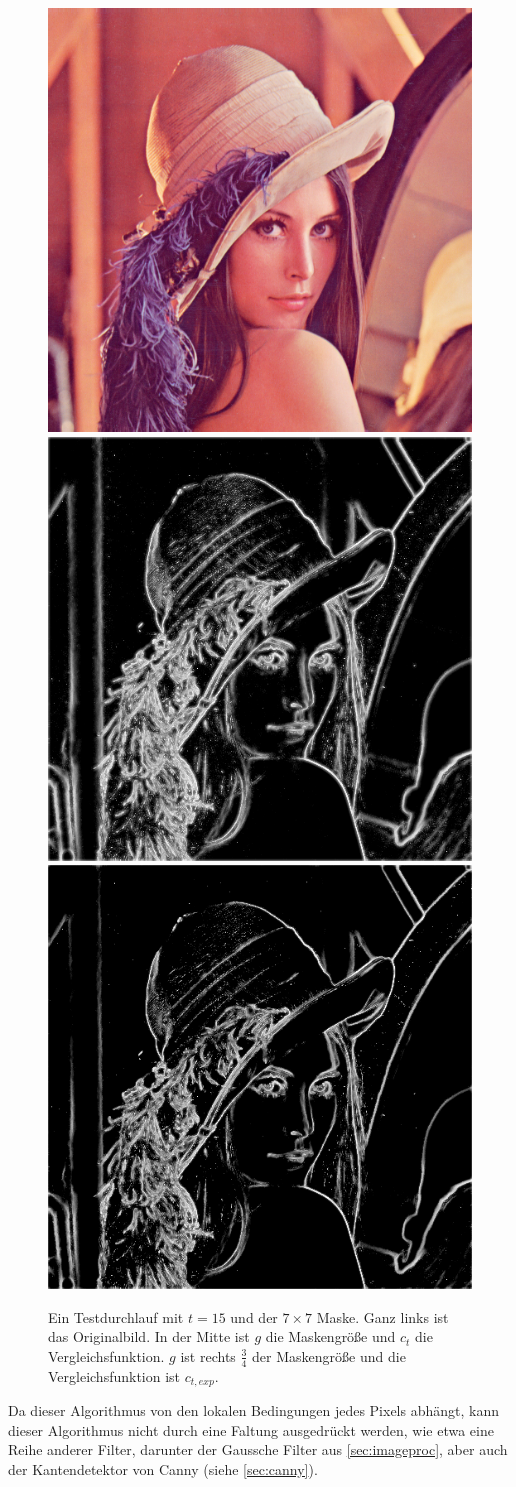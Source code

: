 \documentclass[a4paper, 11pt]{report}
\theoremstyle{definition}
\begin{document}
			\begin{figure}[H]\centering
				\includegraphics[width=.3\textwidth]{../examples/lena/lena.png}\quad
				\includegraphics[width=.3\textwidth]{../examples/lena/no-geom_raw.png}\quad
				\includegraphics[width=.3\textwidth]{../examples/lena/15_out_raw.png}
				\caption{Ein Testdurchlauf mit $t=15$ und der $7\times 7$ Maske. Ganz links ist das Originalbild. In der Mitte ist $g$ die Maskengröße und $c_t$ die Vergleichsfunktion. $g$ ist rechts $\frac{3}{4}$ der Maskengröße und die Vergleichsfunktion ist $c_{t,exp}$.}
				\label{fig:lena_first_test}
			\end{figure}

			Da dieser Algorithmus von den lokalen Bedingungen jedes Pixels abhängt, kann dieser Algorithmus nicht durch eine Faltung ausgedrückt werden, wie etwa eine Reihe anderer Filter, darunter der Gaussche Filter aus \ref{sec:imageproc}, aber auch der Kantendetektor von Canny (siehe \ref{sec:canny}).
\end{document}
